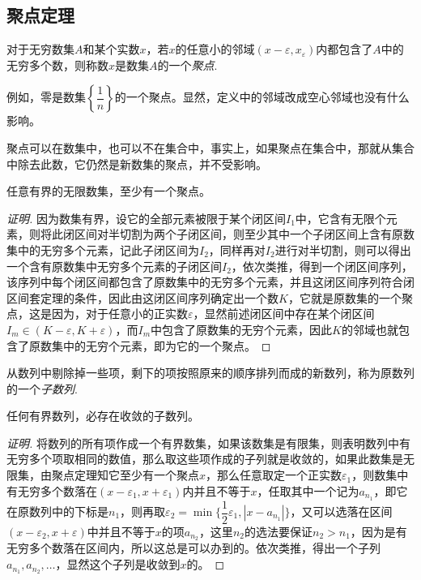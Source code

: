 \subsection{聚点定理}
\label{sec:accumulate-point-theorem}

\begin{definition}
  对于无穷数集$A$和某个实数$x$，若$x$的任意小的邻域$(x-\varepsilon,x_{\varepsilon})$内都包含了$A$中的无穷多个数，则称数$x$是数集$A$的一个\emph{聚点}.
\end{definition}

例如，零是数集$\left\{ \dfrac{1}{n} \right\}$的一个聚点。显然，定义中的邻域改成空心邻域也没有什么影响。

聚点可以在数集中，也可以不在集合中，事实上，如果聚点在集合中，那就从集合中除去此数，它仍然是新数集的聚点，并不受影响。

\begin{theorem}
  任意有界的无限数集，至少有一个聚点。
\end{theorem}

\begin{proof}[证明]
  因为数集有界，设它的全部元素被限于某个闭区间$I_1$中，它含有无限个元素，则将此闭区间对半切割为两个子闭区间，则至少其中一个子闭区间上含有原数集中的无穷多个元素，记此子闭区间为$I_2$，同样再对$I_2$进行对半切割，则可以得出一个含有原数集中无穷多个元素的子闭区间$I_2$，依次类推，得到一个闭区间序列，该序列中每个闭区间都包含了原数集中的无穷多个元素，并且这闭区间序列符合闭区间套定理的条件，因此由这闭区间序列确定出一个数$K$，它就是原数集的一个聚点，这是因为，对于任意小的正实数$\varepsilon$，显然前述闭区间中存在某个闭区间$I_m \in (K-\varepsilon,K+\varepsilon)$，而$I_m$中包含了原数集的无穷个元素，因此$K$的邻域也就包含了原数集中的无穷个元素，即为它的一个聚点。
\end{proof}

从数列中剔除掉一些项，剩下的项按照原来的顺序排列而成的新数列，称为原数列的一个\emph{子数列}.
\begin{inference}
  任何有界数列，必存在收敛的子数列。
\end{inference}

\begin{proof}[证明]
  将数列的所有项作成一个有界数集，如果该数集是有限集，则表明数列中有无穷多个项取相同的数值，那么取这些项作成的子列就是收敛的，如果此数集是无限集，由聚点定理知它至少有一个聚点$x$，那么任意取定一个正实数$\varepsilon_1$，则数集中有无穷多个数落在$(x-\varepsilon_1,x+\varepsilon_1)$内并且不等于$x$，任取其中一个记为$a_{n_1}$，即它在原数列中的下标是$n_1$，则再取$\varepsilon_2 = \min \{ \dfrac{1}{2}\varepsilon_1, |x-a_{n_1}| \}$，又可以选落在区间$(x-\varepsilon_2,x+\varepsilon)$中并且不等于$x$的项$a_{n_2}$，这里$n_2$的选法要保证$n_2>n_1$，因为是有无穷多个数落在区间内，所以这总是可以办到的。依次类推，得出一个子列$a_{n_1},a_{n_2},\ldots$，显然这个子列是收敛到$x$的。
\end{proof}

